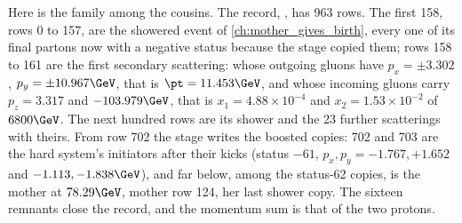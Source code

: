 Here is the family among the cousins. The record,
, has 963 rows. The first 158, rows 0 to
157, are the showered event of \cref{ch:mother_gives_birth}, every one of
its final partons now with a negative status because the stage copied
them; rows 158 to 161 are the first secondary scattering:
whose outgoing gluons have $p_x=\pm3.302$, $p_y=\pm10.967\GeV$, that is
$\pt=11.453\GeV$, and whose incoming gluons carry $p_z=3.317$ and
$-103.979\GeV$, that is $x_1=4.88\times10^{-4}$ and $x_2=1.53\times10^{-2}$
of $6800\GeV$. The next hundred rows are its shower and the 23 further
scatterings with theirs. From row 702 the stage writes the boosted copies:
702 and 703 are the hard system's initiators after their kicks
(status $-61$, $p_x,p_y=-1.767,+1.652$ and $-1.113,-1.838\GeV$), and far
below, among the status-62 copies,
is the mother at $78.29\GeV$, mother row 124, her last shower copy. The
sixteen remnants close the record,
and the momentum sum is that of the two protons.

